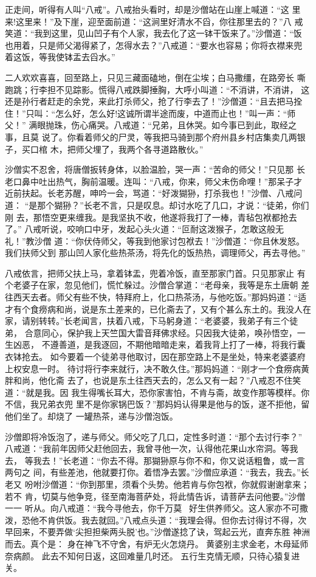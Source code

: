 正走间，听得有人叫“八戒”。八戒抬头看时，却是沙僧站在山崖上喊道：“这
里来!这里来！”及下崖，迎至面前道：“这涧里好清水不舀，你往那里去的？”八
戒笑道：“我到这里，见山凹子有个人家，我去化了这一钵干饭来了。”沙僧道：“饭
也用着，只是师父渴得紧了，怎得水去？”八戒道：“要水也容易；你将衣襟来兜
着这饭，等我使钵盂去舀水。”

二人欢欢喜喜，回至路上，只见三藏面磕地，倒在尘埃；白马撒缰，在路旁长
嘶跑跳；行李担不见踪影。慌得八戒跌脚捶胸，大呼小叫道：“不消讲，不消讲，
这还是孙行者赶走的余党，来此打杀师父，抢了行李去了！”沙僧道：“且去把马拴
住！”只叫：“怎么好，怎么好!这诚所谓半途而废，中道而止也！”叫一声：“师父！”
满眼抛珠，伤心痛哭。八戒道：“兄弟，且休哭。如今事已到此，取经之事，且莫
说了。你看着师父的尸灵，等我把马骑到那个府州县乡村店集卖几两银子，买口棺
木，把师父埋了，我两个各寻道路散伙。”

沙僧实不忍舍，将唐僧扳转身体，以脸温脸，哭一声：“苦命的师父！”只见那
长老口鼻中吐出热气，胸前温暖。连叫：“八戒，你来，师父未伤命哩！”那呆子才
近前扶起。长老苏醒，呻吟一会，骂道：“好泼猢狲，打杀我也！”沙僧、八戒问道：
“是那个猢狲？”长老不言，只是叹息。却讨水吃了几口，才说：“徒弟，你们刚
去，那悟空更来缠我。是我坚执不收，他遂将我打了一棒，青毡包袱都抢去了。”
八戒听说，咬响口中牙，发起心头火道：“叵耐这泼猴子，怎敢这般无礼！”教沙僧
道：“你伏侍师父，等我到他家讨包袱去！”沙僧道：“你且休发怒。我们扶师父到
那山凹人家化些热茶汤，将先化的饭热热，调理师父，再去寻他。”

八戒依言，把师父扶上马，拿着钵盂，兜着冷饭，直至那家门首。只见那家止
有个老婆子在家，忽见他们，慌忙躲过。沙僧合掌道：“老母亲，我等是东土唐朝
差往西天去者。师父有些不快，特拜府上，化口热茶汤，与他吃饭。”那妈妈道：“适
才有个食痨病和尚，说是东土差来的，已化斋去了，又有个甚么东土的。我没人在
家，请别转转。”长老闻言，扶着八戒，下马躬身道：“老婆婆，我弟子有三个徒弟，
合意同心，保护我上天竺国大雷音拜佛求经。只因我大徒弟，唤孙悟空，一生凶恶，
不遵善道，是我逐回，不期他暗暗走来，着我背上打了一棒，将我行囊衣钵抢去。
如今要着一个徒弟寻他取讨，因在那空路上不是坐处，特来老婆婆府上权安息一时。
待讨将行李来就行，决不敢久住。”那妈妈道：“刚才一个食痨病黄胖和尚，他化斋
去了，也说是东土往西天去的，怎么又有一起？”八戒忍不住笑道：“就是我。因
我生得嘴长耳大，恐你家害怕，不肯与斋，故变作那等模样。你不信，我兄弟衣兜
里不是你家锅巴饭？”那妈妈认得果是他与的饭，遂不拒他，留他们坐了。却烧了
一罐热茶，递与沙僧泡饭。

沙僧即将冷饭泡了，递与师父。师父吃了几口，定性多时道：“那个去讨行李？”
八戒道：“我前年因师父赶他回去，我曾寻他一次，认得他花果山水帘洞。等我去，
等我去！”长老道：“你去不得。那猢狲原与你不和，你又说话粗鲁，或一言两句之
间，有些差池，他就要打你。着悟净去罢。”沙僧应承道：“我去，我去。”长老又
吩咐沙僧道：“你到那里，须看个头势。他若肯与你包袱，你就假谢谢拿来；若不
肯，切莫与他争竞，径至南海菩萨处，将此情告诉，请菩萨去问他要。”沙僧一一
听从。向八戒道：“我今寻他去，你千万莫，好生供养师父。这人家亦不可撒
泼，恐他不肯供饭。我去就回。”八戒点头道：“我理会得。但你去讨得讨不得，次
早回来，不要弄做‘尖担担柴两头脱’也。”沙僧遂捻了诀，驾起云光，直奔东胜
神洲而去。真个是：
身在神飞不守舍，有炉无火怎烧丹。
黄婆别主求金老，木母延师奈病颜。
此去不知何日返，这回难量几时还。
五行生克情无顺，只待心猿复进关。

